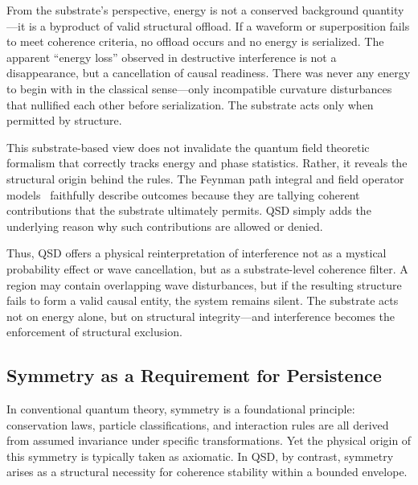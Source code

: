 \documentclass[entropy,article,submit,pdftex,oneauthor]{Definitions/mdpi}
\begin{document}
From the substrate’s perspective, energy is not a conserved background quantity—it is a byproduct of valid structural offload. If a waveform or superposition fails to meet coherence criteria, no offload occurs and no energy is serialized. The apparent “energy loss” observed in destructive interference is not a disappearance, but a cancellation of causal readiness. There was never any energy to begin with in the classical sense—only incompatible curvature disturbances that nullified each other before serialization. The substrate acts only when permitted by structure.

This substrate-based view does not invalidate the quantum field theoretic formalism that correctly tracks energy and phase statistics. Rather, it reveals the structural origin behind the rules. The Feynman path integral and field operator models~\cite{feynman-qed} faithfully describe outcomes because they are tallying coherent contributions that the substrate ultimately permits. QSD simply adds the underlying reason why such contributions are allowed or denied.

Thus, QSD offers a physical reinterpretation of interference not as a mystical probability effect or wave cancellation, but as a substrate-level coherence filter. A region may contain overlapping wave disturbances, but if the resulting structure fails to form a valid causal entity, the system remains silent. The substrate acts not on energy alone, but on structural integrity—and interference becomes the enforcement of structural exclusion.


\subsection{Symmetry as a Requirement for Persistence}

In conventional quantum theory, symmetry is a foundational principle: conservation laws, particle classifications, and interaction rules are all derived from assumed invariance under specific transformations. Yet the physical origin of this symmetry is typically taken as axiomatic. In QSD, by contrast, symmetry arises as a structural necessity for coherence stability within a bounded envelope.
\end{document}
